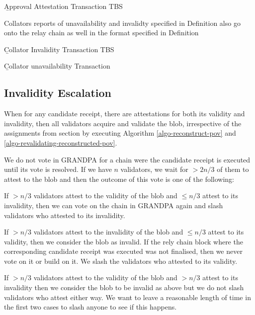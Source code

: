 \begin{definition}
  \label{defn-approval-attestation-transaction}
        {\b Approval Attestation Transaction} TBS
\end{definition}

Collators reports of unavailability and invalidty specified in Definition
 also  go onto the relay chain as well in the format
specified in Definition

\begin{definition}
  \label{defn-collator-invalidity-transaction}
        {\b Collator Invalidity Transaction}
        TBS
\end{definition}

\begin{definition}
  \label{defn-collator-unavailability-transaction}
        {\b Collator unavailability Transaction}
\end{definition}

\subsection{Invalidity Escalation}\label{escalation}

When for any candidate receipt, there are attestations for both its validity and
invalidity, then all validators acquire and validate the blob, irrespective of
the assignments from section by executing Algorithm \ref{algo-reconstruct-pov}
and \ref{algo-revalidating-reconstructed-pov}.
\newline

We do not vote in GRANDPA for a chain were the candidate receipt is executed
until its vote is resolved. If we have $n$ validators, we wait for $>2n/3$ of
them to attest to the blob and then the outcome of this vote is one of the
following:
\newline

If $>n/3$ validators attest to the validity of the blob and $\leq n/3$ attest to
its invalidity, then we can vote on the chain in GRANDPA again and slash
validators who attested to its invalidity.
\newline

If $>n/3$ validators attest to the invalidity of the blob and $\leq n/3$ attest
to its validity, then we consider the blob as invalid. If the rely chain block
where the corresponding candidate receipt was executed was not finalised, then
we never vote on it or build on it. We slash the validators who attested to its
validity.
\newline

If $>n/3$ validators attest to the validity of the blob and $>n/3$ attest to its
invalidity then we consider the blob to be invalid as above but we do not slash
validators who attest either way. We want to leave a reasonable length of time
in the first two cases to slash anyone to see if this happens.
